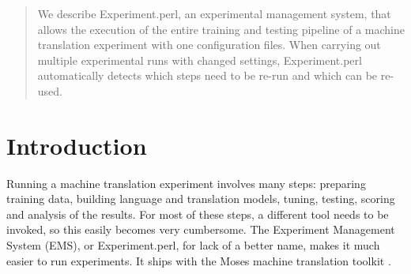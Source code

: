 \documentclass{pbml}
\begin{document}

\begin{abstract}
We describe Experiment.perl, an experimental management system, that allows the execution of the entire training and testing pipeline of a machine translation experiment with one configuration files. When carrying out multiple experimental runs with changed settings, Experiment.perl automatically detects which steps need to be re-run and which can be re-used.
\end{abstract}







\section{\label{experiment-perl.texntoc1}Introduction}

Running a machine translation experiment involves many steps: preparing training data, building language and translation models, tuning, testing, scoring and analysis of the results. For most of these steps, a different tool needs to be invoked, so this easily becomes very cumbersome.
The Experiment Management System (EMS), or Experiment.perl, for lack of a better name, makes it much easier to run experiments. It ships with the Moses machine translation toolkit \citep{koehn-EtAl:2007:PosterDemo}.
\end{document}
